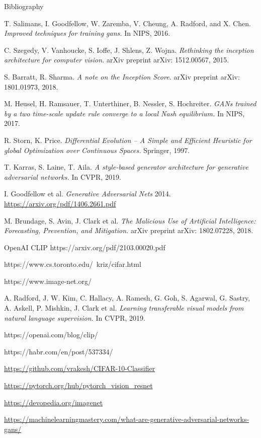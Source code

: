 \documentclass[t]{beamer}
\begin{document}
\begin{frame}{Bibliography}
\fontsize{2}{7.2}\selectfont
\begin{thebibliography}{a,b,c}
 T. Salimans, I. Goodfellow, W. Zaremba, V. Cheung, A. Radford, and X. Chen. {\it Improved techniques for training gans.} In NIPS, 2016.

 C. Szegedy, V. Vanhoucke, S. Ioffe, J. Shlens, Z. Wojna. {\it Rethinking the inception architecture for computer vision.} arXiv preprint arXiv: 1512.00567, 2015.

 S. Barratt, R. Sharma. {\it A note on the Inception Score.} arXiv preprint arXiv: 1801.01973, 2018.

 M. Heusel, H. Ramsauer, T. Unterthiner, B. Nessler, S. Hochreiter. {\it GANs trained by a two time-scale update rule converge to a local Nash equilibrium.} In NIPS, 2017.

 R. Storn, K. Price. {\it Differential Evolution – A Simple and Efficient Heuristic for global Optimization over Continuous Spaces.} Springer, 1997.

 T. Karras, S. Laine, T. Aila. {\it A style-based generator architecture for generative adversarial networks.} In CVPR, 2019.

 I. Goodfellow et al.  {\it Generative Adversarial Nets} 2014.  \url{https://arxiv.org/pdf/1406.2661.pdf}

 M. Brundage, S. Avin, J. Clark et al. {\it The Malicious Use of Artificial Intelligence: Forecasting, Prevention, and Mitigation.} arXiv preprint arXiv: 1802.07228, 2018.

 OpenAI CLIP https://arxiv.org/pdf/2103.00020.pdf

 https://www.cs.toronto.edu/~kriz/cifar.html

 https://www.image-net.org/

 A. Radford, J. W. Kim, C. Hallacy, A. Ramesh, G. Goh, S. Agarwal, G. Sastry, A. Askell, P. Mishkin, J. Clark et al. {\it Learning transferable visual models
from natural language supervision.} In CVPR, 2019.

 https://openai.com/blog/clip/

 https://habr.com/en/post/537334/

 \url{https://github.com/vrakesh/CIFAR-10-Classifier}

 \url{https://pytorch.org/hub/pytorch_vision_resnet}

 \url{https://devopedia.org/imagenet}

 \url{https://machinelearningmastery.com/what-are-generative-adversarial-networks-gans/}

\end{thebibliography}
\end{frame}
\end{document}
